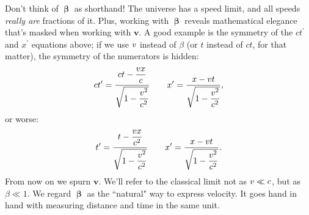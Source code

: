 \documentclass[12pt]{article}
\newcommand{\abs}[1]{\mathnormal \vv{#1}}
\renewcommand{\vv}[1]{\mathbf{#1}}
\newcommand{\vvbeta}{\bm{\upbeta}}
\begin{document}
Don't think of $\vvbeta$ as shorthand! The universe has a speed limit, and all speeds \emph{really are} fractions of it. Plus, working with $\vvbeta$ reveals mathematical elegance that's masked when working with $\vv v$. A good example is the symmetry of the $ct^\prime$ and $x^\prime$ equations above; if we use $\abs v$ instead of $\beta$ (or $t$ instead of $ct$, for that matter), the symmetry of the numerators is hidden:
\begin{equation*}
ct^\prime = \frac{ct - \dfrac{vx}{\vphantom{V_v} c}}{\sqrt{1 - \dfrac{v^2}{c^2}}} \qquad x^\prime = \frac{x - vt}{\sqrt{1 - \dfrac{v^2}{c^2}}},
\end{equation*}
or worse:
\begin{equation*}
t^\prime = \frac{t - \dfrac{vx}{\vphantom{V_v} c^2}}{\sqrt{1 - \dfrac{v^2}{c^2}}} \qquad x^\prime = \frac{x - vt}{\sqrt{1 - \dfrac{v^2}{c^2}}}.
\end{equation*}
From now on we spurn $\vv v$. We'll refer to the classical limit not as $\abs v \ll c$, but as $\beta \ll 1$. We regard $\vvbeta$ as the ``natural" way to express velocity. It goes hand in hand with measuring distance and time in the same unit.
 
\end{document}
